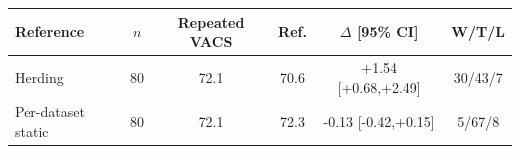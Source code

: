 \begin{tabular}{lccccc}
\toprule
Reference & $n$ & Repeated VACS & Ref. & $\Delta$ [95\% CI] & W/T/L \\
\midrule
Herding & 80 & 72.1 & 70.6 & +1.54 [+0.68,+2.49] & 30/43/7 \\
Per-dataset static & 80 & 72.1 & 72.3 & -0.13 [-0.42,+0.15] & 5/67/8 \\
\bottomrule
\end{tabular}
